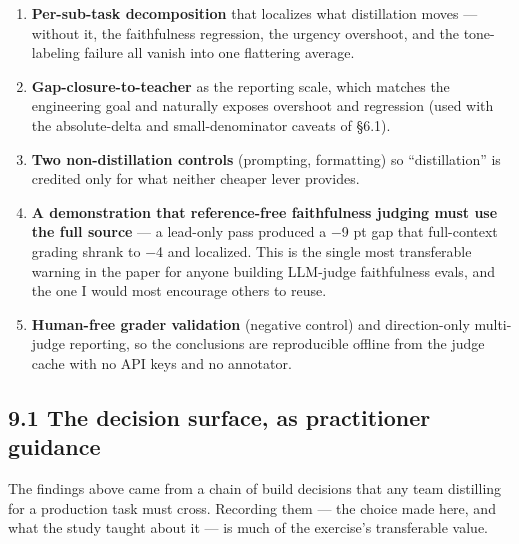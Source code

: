 \documentclass[11pt]{article}
\providecommand{\tightlist}{\setlength{\itemsep}{0pt}\setlength{\parskip}{0pt}}
\providecommand{\tightlist}{%
  \setlength{\itemsep}{0pt}\setlength{\parskip}{0pt}}
\begin{document}
\begin{enumerate}
\def\labelenumi{\arabic{enumi}.}
\tightlist
\item
  \textbf{Per-sub-task decomposition} that localizes what distillation
  moves --- without it, the faithfulness regression, the urgency
  overshoot, and the tone-labeling failure all vanish into one
  flattering average.
\item
  \textbf{Gap-closure-to-teacher} as the reporting scale, which matches
  the engineering goal and naturally exposes overshoot and regression
  (used with the absolute-delta and small-denominator caveats of §6.1).
\item
  \textbf{Two non-distillation controls} (prompting, formatting) so
  ``distillation'' is credited only for what neither cheaper lever
  provides.
\item
  \textbf{A demonstration that reference-free faithfulness judging must
  use the full source} --- a lead-only pass produced a −9 pt gap that
  full-context grading shrank to −4 and localized. This is the single
  most transferable warning in the paper for anyone building LLM-judge
  faithfulness evals, and the one I would most encourage others to
  reuse.
\item
  \textbf{Human-free grader validation} (negative control) and
  direction-only multi-judge reporting, so the conclusions are
  reproducible offline from the judge cache with no API keys and no
  annotator.
\end{enumerate}

\subsection{9.1 The decision surface, as practitioner
guidance}\label{the-decision-surface-as-practitioner-guidance}

The findings above came from a chain of build decisions that any team
distilling for a production task must cross. Recording them --- the
choice made here, and what the study taught about it --- is much of the
exercise's transferable value.
\end{document}
